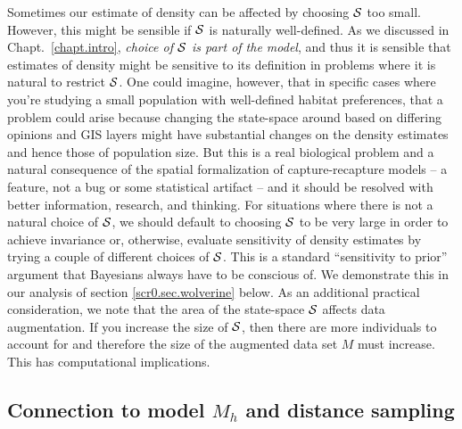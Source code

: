 Sometimes our estimate of density can be affected by choosing ${\cal
  S}$ too small. However, this might be sensible if ${\cal S}$ is
naturally well-defined. As we discussed in Chapt.~\ref{chapt.intro},
{\it choice of ${\cal S}$ is part of the model}, and thus it is
sensible that estimates of density might be sensitive to its
definition in problems where it is natural to restrict ${\cal S}$.
One could imagine, however, that in specific cases where you're
studying a small population with well-defined habitat preferences,
that a problem could arise because changing the state-space around
based on differing opinions and GIS layers might have substantial
changes on the density estimates and hence those of population
size. But this is a real biological problem and a natural consequence
of the spatial formalization of capture-recapture models -- a feature,
not a bug or some statistical artifact -- and it should be resolved
with better information, research, and thinking.  For situations where
there is not a natural choice of ${\cal S}$, we should default to
choosing ${\cal S}$ to be very large in order to achieve invariance
or, otherwise, evaluate sensitivity of density estimates by trying a
couple of different choices of ${\cal S}$. This is a standard
``sensitivity to prior'' argument that Bayesians always have to be
conscious of.  We demonstrate this in our analysis of section
\ref{scr0.sec.wolverine} below. As an additional practical
consideration, we note that the area of the state-space ${\cal S}$
affects data
augmentation. If you increase the size of ${\cal S}$, then there are more
individuals to account for and therefore the size of the augmented
data set $M$ must increase. This has computational implications.

\subsection{Connection to model $M_h$ and distance sampling}
 \label{scr0.sec.scrmh}

